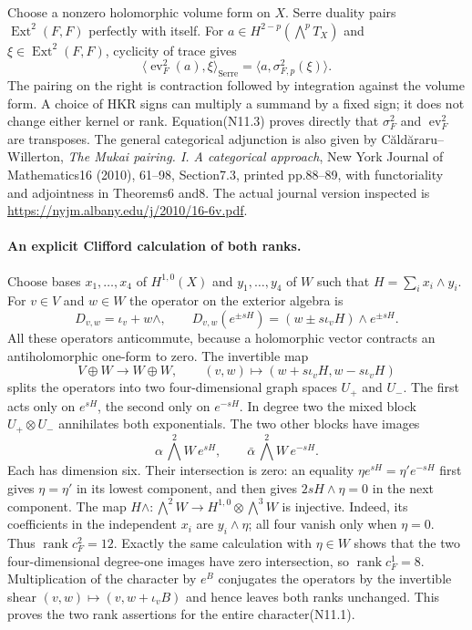 Choose a nonzero holomorphic volume form on $X$. Serre duality
pairs $\operatorname{Ext}^2(F,F)$ perfectly with itself.
For $a\in H^{2-p}(\bigwedge^pT_X)$ and
$\xi\in\operatorname{Ext}^2(F,F)$, cyclicity of trace gives
\[
 \bigl\langle\operatorname{ev}_F^2(a),\xi\bigr\rangle_{
 \mathrm{Serre}}
 =\bigl\langle a,\sigma_{F,p}^2(\xi)\bigr\rangle.          \tag{N11.3}
\]
The pairing on the right is contraction followed by integration
against the volume form. A choice of HKR signs can multiply a
summand by a fixed sign; it does not change either kernel or rank.
Equation(N11.3) proves directly that $\sigma_F^2$ and
$\operatorname{ev}_F^2$ are transposes. The general categorical
adjunction is also given by C\u{a}ld\u{a}raru--Willerton,
\emph{The Mukai pairing. I. A categorical approach},
New York Journal of Mathematics16 (2010), 61--98, Section7.3,
printed pp.88--89, with functoriality and adjointness in Theorems6 and8.
The actual journal version inspected is
\url{https://nyjm.albany.edu/j/2010/16-6v.pdf}.

\paragraph{An explicit Clifford calculation of both ranks.}
Choose bases $x_1,\ldots,x_4$ of $H^{1,0}(X)$ and
$y_1,\ldots,y_4$ of $W$ such that
$H=\sum_i x_i\wedge y_i$. For $v\in V$ and $w\in W$ the
operator on the exterior algebra is
\[
 D_{v,w}=\iota_v+w\wedge,
 \qquad
 D_{v,w}(e^{\pm sH})=(w\pm s\iota_vH)\wedge e^{\pm sH}.
                                                               \tag{N11.4}
\]
All these operators anticommute, because a holomorphic vector
contracts an antiholomorphic one-form to zero. The invertible map
\[
 V\oplus W\longrightarrow W\oplus W,
 \qquad(v,w)\longmapsto(w+s\iota_vH,w-s\iota_vH)             \tag{N11.5}
\]
splits the operators into two four-dimensional graph spaces
$U_+$ and $U_-$. The first acts only on $e^{sH}$, the second
only on $e^{-sH}$. In degree two the mixed block
$U_+\otimes U_-$ annihilates both exponentials. The two other
blocks have images
\[
 \alpha\,\bigwedge^2W\,e^{sH},
 \qquad\bar\alpha\,\bigwedge^2W\,e^{-sH}.                 \tag{N11.6}
\]
Each has dimension six. Their intersection is zero: an equality
$\eta e^{sH}=\eta'e^{-sH}$ first gives $\eta=\eta'$ in its
lowest component, and then gives $2sH\wedge\eta=0$ in the
next component. The map
$H\wedge:\bigwedge^2W\to H^{1,0}\otimes\bigwedge^3W$
is injective. Indeed, its coefficients in the independent $x_i$
are $y_i\wedge\eta$; all four vanish only when $\eta=0$.
Thus $\operatorname{rank}c_F^2=12$.
Exactly the same calculation with $\eta\in W$ shows that the
two four-dimensional degree-one images have zero intersection,
so $\operatorname{rank}c_F^1=8$.
Multiplication of the character by $e^B$ conjugates the operators
by the invertible shear
$(v,w)\mapsto(v,w+\iota_vB)$ and hence leaves both ranks unchanged.
This proves the two rank assertions for the entire character(N11.1).


